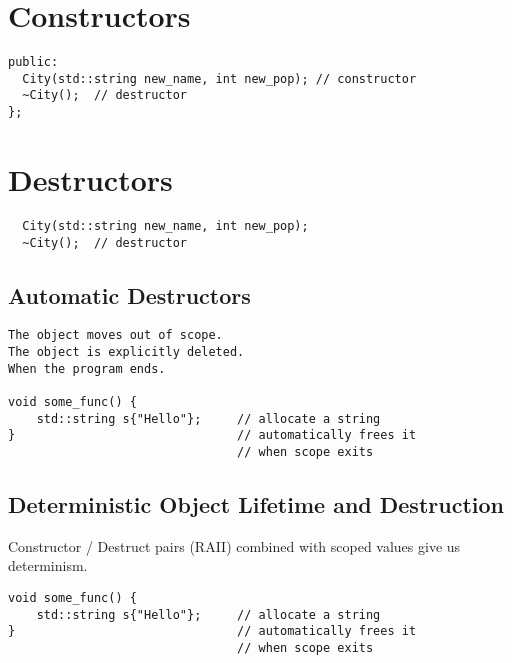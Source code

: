 \section{Constructors}

\begin{verbatim}
public:
  City(std::string new_name, int new_pop); // constructor
  ~City();  // destructor
};
\end{verbatim}

\section{Destructors}

\begin{verbatim}
  City(std::string new_name, int new_pop);
  ~City();  // destructor
\end{verbatim}

\subsection{Automatic Destructors}

\begin{verbatim}
The object moves out of scope.
The object is explicitly deleted.
When the program ends.

void some_func() {
    std::string s{"Hello"};     // allocate a string
}                               // automatically frees it
                                // when scope exits
\end{verbatim}

\subsection{Deterministic Object Lifetime and Destruction}

Constructor / Destruct pairs (RAII) combined with scoped values give us determinism.

\begin{verbatim}
void some_func() {
    std::string s{"Hello"};     // allocate a string
}                               // automatically frees it
                                // when scope exits
\end{verbatim}


